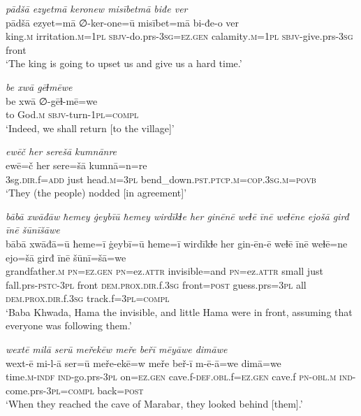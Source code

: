 \ea \label{BP.102}
\textit{pādšā ezyetmā keronew misībetmā biđe ver} \\ 
\gll pādšā ezyet=mā ∅-ker-one=ū misībet=mā bi-đe-o ver \\ 
 king\textsc{.m} irritation\textsc{.m}\textsc{=\textsc{1pl}} \textsc{sbjv-}do.prs\textsc{-3sg}\textsc{=ez.gen} calamity\textsc{.m}\textsc{=\textsc{1pl}} \textsc{sbjv-}give.prs\textsc{-3sg} front \\ 
\glt `The king is going to upset us and give us a hard time.'
\z 
 
\ea \label{BP.103}
\textit{be xwā gēɫmēwe} \\ 
\gll be xwā ∅-gēɫ-mē=we \\ 
 to God\textsc{.m} \textsc{sbjv-}turn\textsc{-\textsc{1pl}}\textsc{=compl} \\ 
\glt `Indeed, we shall return [to the village]'
\z 
 
\ea \label{BP.104}
\textit{ewēč her serešā kumnānre} \\ 
\gll ewē=č her sere=šā kumnā=n=re \\ 
 3sg\textsc{.dir}.f\textsc{=add} just head\textsc{.m}\textsc{=3pl} bend\_down\textsc{.pst}\textsc{.ptcp}\textsc{.m}\textsc{=cop}\textsc{.3sg}\textsc{.m}\textsc{=\textsc{povb}} \\ 
\glt `They (the people) nodded [in agreement]'
\z 
 
\ea \label{BP.105}
\textit{bābā xwāđāw ħemey ġeybīū ħemey wirdīkɫe her ginēnē weɫē īnē weɫēne ejošā girđ īnē šūnīšāwe} \\ 
\gll bābā xwāđā=ū ħeme=ī ġeybī=ū ħeme=ī wirdīkɫe her gin-ēn-ē weɫē īnē weɫē=ne ejo=šā girđ īnē šūnī=šā=we \\ 
 grandfather\textsc{.m} \textsc{pn}\textsc{=ez.gen} \textsc{pn}=ez.\textsc{attr} invisible=and \textsc{pn}=ez.\textsc{attr} small just fall.prs\textsc{-pstc}\textsc{-3pl} front \textsc{dem.prox}\textsc{.dir}.f\textsc{.3sg} front\textsc{=\textsc{post}} guess.prs\textsc{=3pl} all \textsc{dem.prox}\textsc{.dir}.f\textsc{.3sg} track.f\textsc{=3pl}\textsc{=compl} \\ 
\glt `Baba Khwada, Hama the invisible, and little Hama were in front, assuming that everyone was following them.'
\z 
 
\ea \label{BP.106}
\textit{wextē milā serū meřekēw meře beřī mēyāwe dimāwe} \\ 
\gll wext-ē mi-l-ā ser=ū meře-ekē=w meře beř-ī m-ē-ā=we dimā=we \\ 
 time\textsc{.m}\textsc{-indf} \textsc{ind-}go.prs\textsc{-3pl} on\textsc{=ez.gen} cave.f\textsc{-def}\textsc{.obl}.f\textsc{=ez.gen} cave.f \textsc{pn}\textsc{-obl}\textsc{.m} \textsc{ind-}come.prs\textsc{-3pl}\textsc{=compl} back\textsc{=\textsc{post}} \\ 
\glt `When they reached the cave of Marabar, they looked behind [them].'
\z 
 
